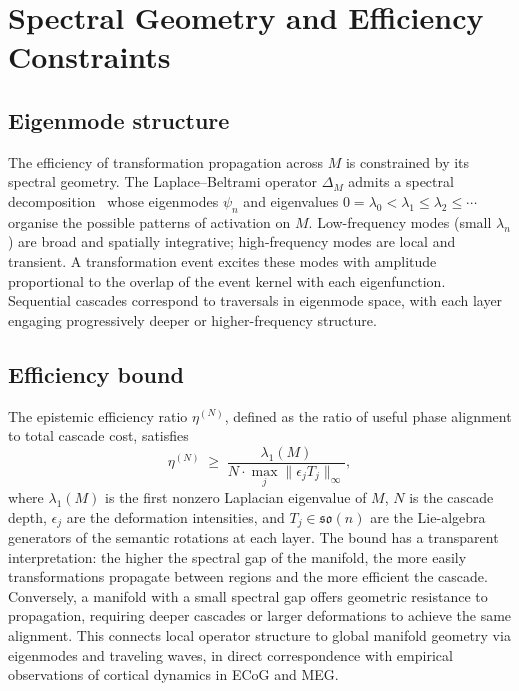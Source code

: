 \documentclass[12pt, a4paper]{article}
\theoremstyle{remark}
\theoremstyle{definition}
\begin{document}
\section{Spectral Geometry and Efficiency Constraints}
\label{sec:spectral}

\subsection{Eigenmode structure}

The efficiency of transformation propagation across $M$ is constrained by its spectral
geometry.  The Laplace--Beltrami operator $\Delta_M$ admits a spectral decomposition~\cite{chavel1984eigenvalues,rosenberg1997laplacian} whose
eigenmodes $\psi_n$ and eigenvalues $0 = \lambda_0 < \lambda_1 \le \lambda_2 \le \cdots$
organise the possible patterns of activation on $M$.  Low-frequency modes (small
$\lambda_n$) are broad and spatially integrative; high-frequency modes are local and
transient.  A transformation event excites these modes with amplitude proportional to the
overlap of the event kernel with each eigenfunction.  Sequential cascades correspond to
traversals in eigenmode space, with each layer engaging progressively deeper or
higher-frequency structure.

\subsection{Efficiency bound}

The epistemic efficiency ratio $\eta^{(N)}$, defined as the ratio of useful phase alignment
to total cascade cost, satisfies
\begin{equation}
  \eta^{(N)} \;\geq\;
  \frac{\lambda_1(M)}{N \cdot \max_j \|\epsilon_j T_j\|_\infty},
  \label{eq:efficiency}
\end{equation}
where $\lambda_1(M)$ is the first nonzero Laplacian eigenvalue of $M$, $N$ is the cascade
depth, $\epsilon_j$ are the deformation intensities, and $T_j \in \mathfrak{so}(n)$ are
the Lie-algebra generators of the semantic rotations at each layer.  The bound has a
transparent interpretation: the higher the spectral gap of the manifold, the more easily
transformations propagate between regions and the more efficient the cascade.  Conversely,
a manifold with a small spectral gap offers geometric resistance to propagation, requiring
deeper cascades or larger deformations to achieve the same alignment.  This connects local
operator structure to global manifold geometry via eigenmodes and traveling waves, in
direct correspondence with empirical observations of cortical dynamics in ECoG and MEG.
\end{document}
